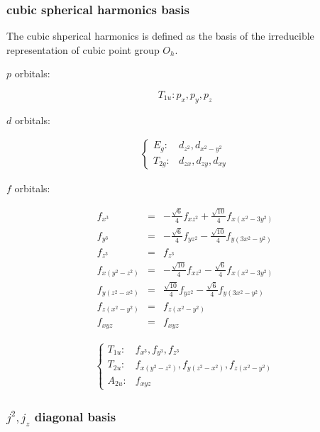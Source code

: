 \subsubsection{cubic spherical harmonics basis}

The cubic shperical harmonics is defined as the basis of the irreducible
representation of cubic point group $O_{h}$.

$p$ orbitals:

\begin{equation}
T_{1u}:p_{x},p_{y},p_{z}
\end{equation}


$d$ orbitals:

\begin{gather}
\begin{cases}
E_{g}: & d_{z^{2}},d_{x^{2}-y^{2}}\\
T_{2g}: & d_{zx},d_{zy},d_{xy}
\end{cases}
\end{gather}


$f$ orbitals:

\begin{eqnarray}
f_{x^{3}} & = & -\frac{\sqrt{6}}{4}f_{xz^{2}}+\frac{\sqrt{10}}{4}f_{x(x^{2}-3y^{2})}\nonumber \\
f_{y^{3}} & = & -\frac{\sqrt{6}}{4}f_{yz^{2}}-\frac{\sqrt{10}}{4}f_{y(3x^{2}-y^{2})}\nonumber \\
f_{z^{3}} & = & f_{z^{3}}\nonumber \\
f_{x(y^{2}-z^{2})} & = & -\frac{\sqrt{10}}{4}f_{xz^{2}}-\frac{\sqrt{6}}{4}f_{x(x^{2}-3y^{2})}\\
f_{y(z^{2}-x^{2})} & = & \frac{\sqrt{10}}{4}f_{yz^{2}}-\frac{\sqrt{6}}{4}f_{y(3x^{2}-y^{2})}\nonumber \\
f_{z(x^{2}-y^{2})} & = & f_{z(x^{2}-y^{2})}\nonumber \\
f_{xyz} & = & f_{xyz}\nonumber 
\end{eqnarray}


\begin{gather}
\begin{cases}
T_{1u}: & f_{x^{3}},f_{y^{3}},f_{z^{3}}\\
T_{2u}: & f_{x(y^{2}-z^{2})},f_{y(z^{2}-x^{2})},f_{z(x^{2}-y^{2})}\\
A_{2u}: & f_{xyz}
\end{cases}
\end{gather}



\subsubsection{$j^{2},j_{z}$ diagonal basis}

